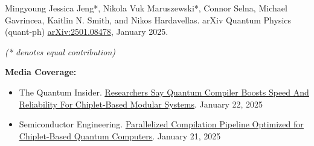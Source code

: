 \hfill\begin{minipage}{\dimexpr\textwidth-24pt}
Mingyoung Jessica Jeng*, Nikola Vuk Maruszewski*, Connor Selna, Michael Gavrincea, Kaitlin N. Smith,
and Nikos Hardavellas. arXiv Quantum Physics (quant-ph)
\href{https://arxiv.org/abs/2501.08478}{\ul{arXiv:2501.08478}}, January 2025.

\vspace{2pt}
\hspace{12pt}\textit{(* denotes equal contribution)}

\vspace{4pt}
\textbf{Media Coverage:}
\begin{itemize}[topsep=0pt,itemsep=0pt]
  \item The Quantum
    Insider. \href{https://thequantuminsider.com/2025/01/22/researchers-say-quantum-compiler-boosts-speed-and-reliability-for-chiplet-based-modular-systems/}{\ul{Researchers
        Say Quantum Compiler Boosts Speed And Reliability For Chiplet-Based Modular Systems}}. January 22, 2025
  \item Semiconductor Engineering. \href{https://semiengineering.com/parallelized-compilation-pipeline-optimized-for-chiplet-based-quantum-computers/}{\ul{Parallelized
      Compilation Pipeline Optimized for Chiplet-Based Quantum Computers}}. January 21, 2025
\end{itemize}
\end{minipage}






\resumeSubHeadingListEnd

